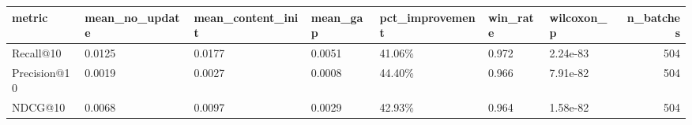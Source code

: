 \begin{tabular}{lllllllr}
\toprule
metric & mean_no_update & mean_content_init & mean_gap & pct_improvement & win_rate & wilcoxon_p & n_batches \\
\midrule
Recall@10 & 0.0125 & 0.0177 & 0.0051 & 41.06\% & 0.972 & 2.24e-83 & 504 \\
Precision@10 & 0.0019 & 0.0027 & 0.0008 & 44.40\% & 0.966 & 7.91e-82 & 504 \\
NDCG@10 & 0.0068 & 0.0097 & 0.0029 & 42.93\% & 0.964 & 1.58e-82 & 504 \\
\bottomrule
\end{tabular}
